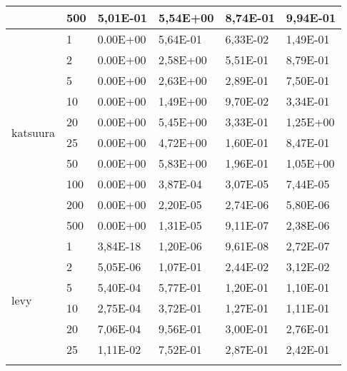 \begin{longtable}[c]{|p{3.5cm}|l|l|l|l|l|}
                                        & 500       & 5,01E-01   & 5,54E+00   & 8,74E-01   & 9,94E-01  \\ \hline
\multirow[t]{10}{*}{katsuura}              & 1         & 0.00E+00   & 5,64E-01   & 6,33E-02   & 1,49E-01  \\ \cline{2-6} 
                                        & 2         & 0.00E+00   & 2,58E+00   & 5,51E-01   & 8,79E-01  \\ \cline{2-6} 
                                        & 5         & 0.00E+00   & 2,63E+00   & 2,89E-01   & 7,50E-01  \\ \cline{2-6} 
                                        & 10        & 0.00E+00   & 1,49E+00   & 9,70E-02   & 3,34E-01  \\ \cline{2-6} 
                                        & 20        & 0.00E+00   & 5,45E+00   & 3,33E-01   & 1,25E+00  \\ \cline{2-6} 
                                        & 25        & 0.00E+00   & 4,72E+00   & 1,60E-01   & 8,47E-01  \\ \cline{2-6} 
                                        & 50        & 0.00E+00   & 5,83E+00   & 1,96E-01   & 1,05E+00  \\ \cline{2-6} 
                                        & 100       & 0.00E+00   & 3,87E-04   & 3,07E-05   & 7,44E-05  \\ \cline{2-6} 
                                        & 200       & 0.00E+00   & 2,20E-05   & 2,74E-06   & 5,80E-06  \\ \cline{2-6} 
                                        & 500       & 0.00E+00   & 1,31E-05   & 9,11E-07   & 2,38E-06  \\ \hline
\multirow[t]{10}{*}{levy}                  & 1         & 3,84E-18   & 1,20E-06   & 9,61E-08   & 2,72E-07  \\ \cline{2-6} 
                                        & 2         & 5,05E-06   & 1,07E-01   & 2,44E-02   & 3,12E-02  \\ \cline{2-6} 
                                        & 5         & 5,40E-04   & 5,77E-01   & 1,20E-01   & 1,10E-01  \\ \cline{2-6} 
                                        & 10        & 2,75E-04   & 3,72E-01   & 1,27E-01   & 1,11E-01  \\ \cline{2-6} 
                                        & 20        & 7,06E-04   & 9,56E-01   & 3,00E-01   & 2,76E-01  \\ \cline{2-6} 
                                        & 25        & 1,11E-02   & 7,52E-01   & 2,87E-01   & 2,42E-01  \\ \cline{2-6} 

\end{longtable}
